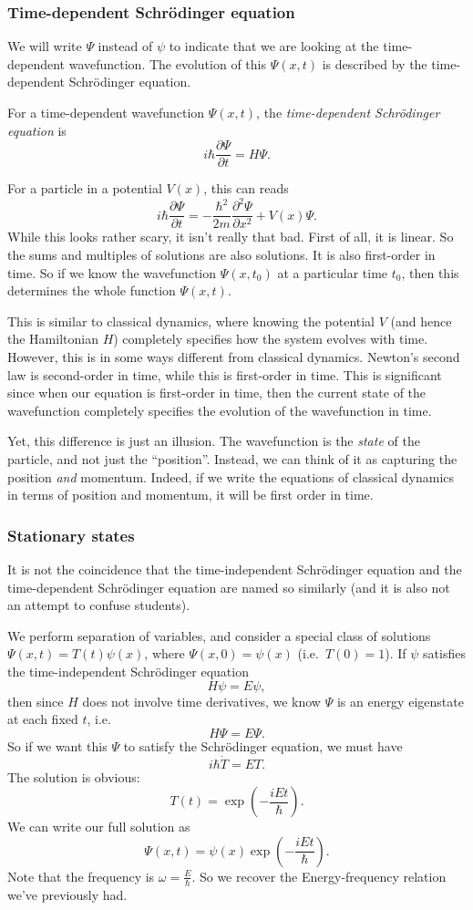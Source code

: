 \documentclass[a4paper]{article}
\begin{document}
\subsubsection*{Time-dependent Schr\"odinger equation}
We will write $\Psi$ instead of $\psi$ to indicate that we are looking at the time-dependent wavefunction. The evolution of this $\Psi(x, t)$ is described by the time-dependent Schr\"odinger equation.
\begin{defi}
  For a time-dependent wavefunction $\Psi(x, t)$, the \emph{time-dependent Schr\"odinger equation} is
  \[
    i\hbar \frac{\partial \Psi}{\partial t} = H\Psi.\tag{$*$}
  \]
\end{defi}
For a particle in a potential $V(x)$, this can reads
\[
  i\hbar \frac{\partial \Psi}{\partial t} = -\frac{\hbar^2}{2m}\frac{\partial^2 \Psi}{\partial x^2} + V(x) \Psi.
\]
While this looks rather scary, it isn't really that bad. First of all, it is linear. So the sums and multiples of solutions are also solutions. It is also first-order in time. So if we know the wavefunction $\Psi(x, t_0)$ at a particular time $t_0$, then this determines the whole function $\Psi(x, t)$.

This is similar to classical dynamics, where knowing the potential $V$ (and hence the Hamiltonian $H$) completely specifies how the system evolves with time. However, this is in some ways different from classical dynamics. Newton's second law is second-order in time, while this is first-order in time. This is significant since when our equation is first-order in time, then the current state of the wavefunction completely specifies the evolution of the wavefunction in time.

Yet, this difference is just an illusion. The wavefunction is the \emph{state} of the particle, and not just the ``position''. Instead, we can think of it as capturing the position \emph{and} momentum. Indeed, if we write the equations of classical dynamics in terms of position and momentum, it will be first order in time.

\subsubsection*{Stationary states}
It is not the coincidence that the time-independent Schr\"odinger equation and the time-dependent Schr\"odinger equation are named so similarly (and it is also not an attempt to confuse students).

We perform separation of variables, and consider a special class of solutions $\Psi(x, t) = T(t) \psi(x)$, where $\Psi(x, 0) = \psi(x)$ (i.e.\ $T(0) = 1$). If $\psi$ satisfies the time-independent Schr\"odinger equation
\[
  H\psi = E\psi,
\]
then since $H$ does not involve time derivatives, we know $\Psi$ is an energy eigenstate at each fixed $t$, i.e.
\[
  H\Psi = E\Psi.
\]
So if we want this $\Psi$ to satisfy the Schr\"odinger equation, we must have
\[
  i\hbar \dot{T} = ET.
\]
The solution is obvious:
\[
  T(t) = \exp\left(-\frac{iEt}{\hbar}\right).
\]
We can write our full solution as
\[
  \Psi(x, t) = \psi(x) \exp\left(-\frac{iEt}{\hbar}\right).
\]
Note that the frequency is $\omega = \frac{E}{\hbar}$. So we recover the Energy-frequency relation we've previously had.
\end{document}
